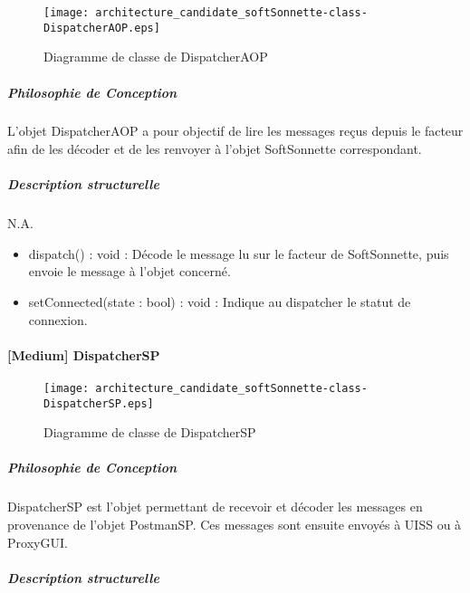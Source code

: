         \begin{figure} [H]
            \centering
            \texttt{[image: architecture\_candidate\_softSonnette-class-DispatcherAOP.eps]}
            \caption{Diagramme de classe de DispatcherAOP}
            \label{Classe-DispatcherAOP}
        \end{figure}
    
        \subparagraph{Philosophie de Conception}%
                        
            L'objet DispatcherAOP a pour objectif de lire les messages reçus depuis le facteur afin de les décoder et de les renvoyer à l'objet SoftSonnette correspondant.

        \subparagraph{Description structurelle}%
                
            N.A.
            

            \begin{itemize}
                \item {dispatch() : void : Décode le message lu sur le facteur de SoftSonnette, puis envoie le message à l'objet concerné.}
                \item {setConnected(state : bool) : void : Indique au dispatcher le statut de connexion.}
            \end{itemize}  
            \newpage

    \paragraph{[Medium] DispatcherSP}

        \begin{figure} [H]
            \centering
            \texttt{[image: architecture\_candidate\_softSonnette-class-DispatcherSP.eps]}
            \caption{Diagramme de classe de DispatcherSP}
            \label{Classe-DispatcherSP}
        \end{figure}
    
            \subparagraph{Philosophie de Conception}%
            DispatcherSP est l'objet permettant de recevoir et décoder les messages en provenance de l'objet PostmanSP.
            Ces messages sont ensuite envoyés à UISS ou à ProxyGUI.                
            \subparagraph{Description structurelle}%
                

